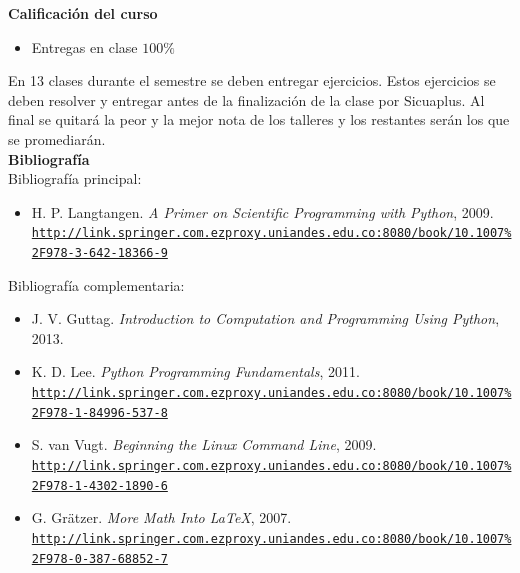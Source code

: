 \documentclass[letterpaper,10pt,onecolumn]{article}
\begin{document}
\noindent\textbf{\large {} \quad Calificaci\'on del curso}\\[-0.2cm]

\begin{itemize}
	\item Entregas en clase $100\%$
\end{itemize}
\noindent\normalsize En 13 clases durante el semestre se deben
entregar ejercicios. 
Estos ejercicios se deben resolver y entregar antes de la
finalizaci\'on de la clase por Sicuaplus.
Al final se quitar\'a la peor y la mejor nota de los talleres y los
restantes ser\'an los que se promediar\'an. 
\\[0.1cm] 

\noindent\textbf{\large {} \quad Bibliografía}\\[-0.2cm]

\noindent\normalsize Bibliografía principal:


\begin{itemize}
	\item H. P. Langtangen. \textit{A Primer on Scientific Programming with Python}, 2009.\\
	\href{http://link.springer.com.ezproxy.uniandes.edu.co:8080/book/10.1007\%2F978-3-642-18366-9}{\nolinkurl{http://link.springer.com.ezproxy.uniandes.edu.co:8080/book/10.1007\%2F978-3-642-18366-9}}\\[-0.6cm]
\end{itemize}

\noindent\normalsize Bibliografía complementaria:

\begin{itemize}
	\item J. V. Guttag. \textit{Introduction to Computation and Programming Using Python}, 2013.
	\item K. D. Lee. \textit{Python Programming Fundamentals}, 2011. \\
	\href{http://link.springer.com.ezproxy.uniandes.edu.co:8080/book/10.1007\%2F978-1-84996-537-8}{\nolinkurl{http://link.springer.com.ezproxy.uniandes.edu.co:8080/book/10.1007\%2F978-1-84996-537-8}}\\[-0.6cm]
	\item S. van Vugt. \textit{Beginning the Linux Command Line}, 2009.\\
	\href{http://link.springer.com.ezproxy.uniandes.edu.co:8080/book/10.1007\%2F978-1-4302-1890-6}{\nolinkurl{http://link.springer.com.ezproxy.uniandes.edu.co:8080/book/10.1007\%2F978-1-4302-1890-6}}\\[-0.6cm]
	\item G. Gr\"atzer. \textit{More Math Into  \LaTeX}, 2007.\\
	\href{http://link.springer.com.ezproxy.uniandes.edu.co:8080/book/10.1007\%2F978-0-387-68852-7}{\nolinkurl{http://link.springer.com.ezproxy.uniandes.edu.co:8080/book/10.1007\%2F978-0-387-68852-7}}
\end{itemize}
\end{document}
